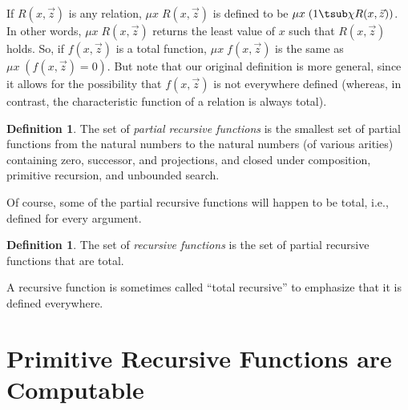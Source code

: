 \documentclass[10pt,a4paper]{article}
\theoremstyle{plain}
\theoremstyle{definition}
\newtheorem{defn}[thm]{Definition}
\theoremstyle{remark}
\newcommand*{\olfileid}[3]{}
\newcommand*{\olsection}[1]{\section*{#1}}
\newcommand*{\ollabel}[1]{\label{#1}}
\providecommand{\Char}{\chi}
\begin{document}
If $R(x,\vec z)$ is any relation, $\mu x \; R(x,\vec z)$ is defined to
be $\mu x \; (1 \tsub \Char{R}(x,\vec z))$. In other words, $\mu x \;
R(x,\vec z)$ returns the least value of $x$ such that $R(x,\vec z)$
holds. So, if $f(x,\vec z)$ is a total function, $\mu x \; f(x,\vec
z)$ is the same as $\mu x \; (f(x,\vec z) = 0)$. But note that our
original definition is more general, since it allows for the
possibility that $f(x,\vec z)$ is not everywhere defined (whereas, in
contrast, the characteristic function of a relation is always total).

\begin{defn}
The set of \emph{partial recursive functions} is the smallest set of
partial functions from the natural numbers to the natural numbers (of
various arities) containing zero, successor, and projections, and
closed under composition, primitive recursion, and unbounded search.
\end{defn}

Of course, some of the partial recursive functions will happen to be
total, i.e., defined for every argument.

\begin{defn}
\ollabel{defn:recursive-fn}
The set of \emph{recursive functions} is
the set of partial recursive functions that are total.
\end{defn}

A recursive function is sometimes called ``total recursive'' to
emphasize that it is defined everywhere.







\olfileid{cmp}{rec}{cmp}
\olsection{Primitive Recursive Functions are Computable}
\end{document}
